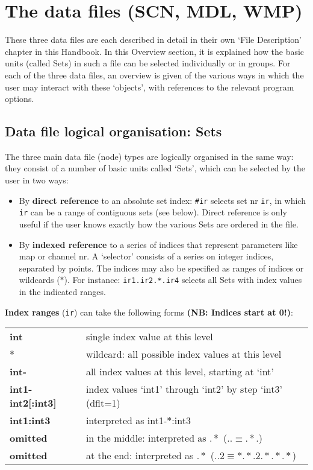 \section{The \NEWSTAR data files (SCN, MDL, WMP)} 

	These three \NEWSTAR data files are each described in detail in their
own `File Description' chapter in this Handbook.  In this Overview section, it
is explained how the basic units (called Sets) in such a file can be selected
individually or in groups.  For each of the three data files, an overview is
given of the various ways in which the user may interact with these `objects',
with references to the relevant program options. 


\subsection{Data file logical organisation: Sets} 
\label{data.sets} 

	The three main \NEWSTAR data file (node) types are logically organised
in the same way: they consist of a number of basic units called `Sets', which
can be selected by the user in two ways: 

\begin{itemize} 
\item 
	By {\bf direct reference} to an absolute set index: {\tt \#ir} selects
set nr {\tt ir}, in which {\tt ir} can be a range of contiguous sets (see
below).  Direct reference is only useful if the user knows exactly how the
various Sets are ordered in the file. 

\item 
	By {\bf indexed reference} to a series of indices that represent
parameters like map or channel nr.  A `selector' consists of a series on
integer indices, separated by points.  The indices may also be specified as
ranges of indices or wildcards ($\ast$).  For instance: {\tt ir1.ir2.*.ir4}
selects all Sets with index values in the indicated ranges. 

\end{itemize} 

	{\bf Index ranges} ({\tt ir}) can take the following forms {\bf (NB:
Indices start at 0!)}: 

\begin{tabular}{ll} {\bf int}               &single index value at this level
\\ {\bf $\ast$}            &wildcard: all possible index values at this level
\\ {\bf int-}              &all index values at this level, starting at `int'
\\ {\bf int1-int2[:int3]}  & 
		index values `int1' through `int2' by step `int3' (dflt=1) \\
{\bf int1:int3}         &interpreted as int1-$\ast$:int3 \\ {\bf omitted}
    &in the middle: interpreted as $.\ast$ 
				($.. \equiv .\ast.$) \\ {\bf omitted}
&at the end: interpreted as $.\ast$ 
				($..2 \equiv \ast.\ast.2.\ast.\ast.\ast$) \\ 
\end{tabular} 



